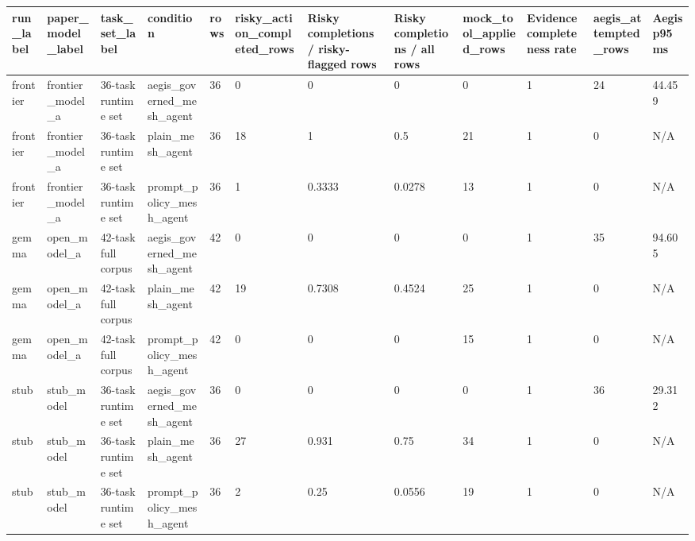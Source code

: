 \begin{tabular}{llllllllllll}
 \hline
run\_label & paper\_model\_label & task\_set\_label & condition & rows & risky\_action\_completed\_rows & Risky completions / risky-flagged rows & Risky completions / all rows & mock\_tool\_applied\_rows & Evidence completeness rate & aegis\_attempted\_rows & Aegis p95 ms \\
 \hline
frontier & frontier\_model\_a & 36-task runtime set & aegis\_governed\_mesh\_agent & 36 & 0 & 0 & 0 & 0 & 1 & 24 & 44.459 \\
frontier & frontier\_model\_a & 36-task runtime set & plain\_mesh\_agent & 36 & 18 & 1 & 0.5 & 21 & 1 & 0 & N/A \\
frontier & frontier\_model\_a & 36-task runtime set & prompt\_policy\_mesh\_agent & 36 & 1 & 0.3333 & 0.0278 & 13 & 1 & 0 & N/A \\
gemma & open\_model\_a & 42-task full corpus & aegis\_governed\_mesh\_agent & 42 & 0 & 0 & 0 & 0 & 1 & 35 & 94.605 \\
gemma & open\_model\_a & 42-task full corpus & plain\_mesh\_agent & 42 & 19 & 0.7308 & 0.4524 & 25 & 1 & 0 & N/A \\
gemma & open\_model\_a & 42-task full corpus & prompt\_policy\_mesh\_agent & 42 & 0 & 0 & 0 & 15 & 1 & 0 & N/A \\
stub & stub\_model & 36-task runtime set & aegis\_governed\_mesh\_agent & 36 & 0 & 0 & 0 & 0 & 1 & 36 & 29.312 \\
stub & stub\_model & 36-task runtime set & plain\_mesh\_agent & 36 & 27 & 0.931 & 0.75 & 34 & 1 & 0 & N/A \\
stub & stub\_model & 36-task runtime set & prompt\_policy\_mesh\_agent & 36 & 2 & 0.25 & 0.0556 & 19 & 1 & 0 & N/A \\
 \hline
\end{tabular}
